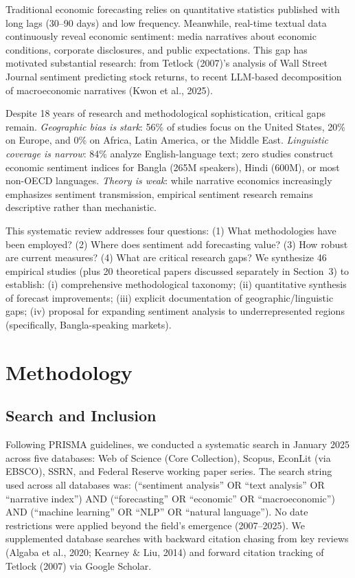 \documentclass[11pt]{article}
\begin{document}
Traditional economic forecasting relies on quantitative statistics published with long lags (30--90 days) and low frequency. Meanwhile, real-time textual data continuously reveal economic sentiment: media narratives about economic conditions, corporate disclosures, and public expectations. This gap has motivated substantial research: from Tetlock (2007)'s analysis of Wall Street Journal sentiment predicting stock returns, to recent LLM-based decomposition of macroeconomic narratives (Kwon et al., 2025).

Despite 18 years of research and methodological sophistication, critical gaps remain. \textit{Geographic bias is stark}: 56\% of studies focus on the United States, 20\% on Europe, and 0\% on Africa, Latin America, or the Middle East. \textit{Linguistic coverage is narrow}: 84\% analyze English-language text; zero studies construct economic sentiment indices for Bangla (265M speakers), Hindi (600M), or most non-OECD languages. \textit{Theory is weak}: while narrative economics increasingly emphasizes sentiment transmission, empirical sentiment research remains descriptive rather than mechanistic.

This systematic review addresses four questions: (1) What methodologies have been employed? (2) Where does sentiment add forecasting value? (3) How robust are current measures? (4) What are critical research gaps? We synthesize 46 empirical studies (plus 20 theoretical papers discussed separately in Section~3) to establish: (i) comprehensive methodological taxonomy; (ii) quantitative synthesis of forecast improvements; (iii) explicit documentation of geographic/linguistic gaps; (iv) proposal for expanding sentiment analysis to underrepresented regions (specifically, Bangla-speaking markets).

\section{Methodology}

\subsection{Search and Inclusion}

Following PRISMA guidelines, we conducted a systematic search in January 2025 across five databases: Web of Science (Core Collection), Scopus, EconLit (via EBSCO), SSRN, and Federal Reserve working paper series. The search string used across all databases was: (``sentiment analysis'' OR ``text analysis'' OR ``narrative index'') AND (``forecasting'' OR ``economic'' OR ``macroeconomic'') AND (``machine learning'' OR ``NLP'' OR ``natural language''). No date restrictions were applied beyond the field's emergence (2007--2025). We supplemented database searches with backward citation chasing from key reviews (Algaba et al., 2020; Kearney \& Liu, 2014) and forward citation tracking of Tetlock (2007) via Google Scholar. 
\end{document}

